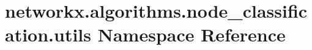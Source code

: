 \hypertarget{namespacenetworkx_1_1algorithms_1_1node__classification_1_1utils}{}\section{networkx.\+algorithms.\+node\+\_\+classification.\+utils Namespace Reference}
\label{namespacenetworkx_1_1algorithms_1_1node__classification_1_1utils}
